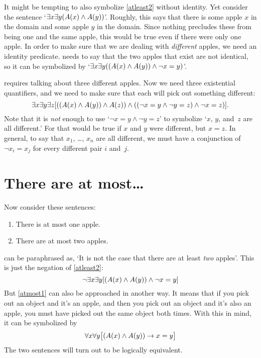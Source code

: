 It might be tempting to also symbolize \cref*{atleast2} without identity. Yet consider the sentence `$\exists x \exists y(A(x) \wedge A(y))$'. Roughly, this says that there is some apple $x$ in the domain and some apple $y$ in the domain. Since nothing precludes these from being one and the same apple, this would be true even if there were only one apple. In order to make sure that we are dealing with \emph{different} apples, we need an identity predicate.  needs to say that the two apples that exist are not identical, so it can be symbolized by `$\exists x \exists y((A(x) \wedge A(y)) \wedge \neg x = y)$'.

 requires talking about three different apples. Now we need three existential quantifiers, and we need to make sure that each will pick out something different: 
\[
	\exists x \exists y\exists z[((A(x) \wedge A(y)) \wedge A(z)) \wedge ((\neg x = y \wedge \neg y = z) \wedge \neg x = z)].
\]
Note that it is \emph{not} enough to use `$\lnot x = y \land \lnot y = z$' to symbolize `$x$, $y$, and~$z$ are all different.' For that would be true if $x$ and $y$ were different, but $x = z$. In general, to say that $x_1$, \dots, $x_n$ are all different, we must have a conjunction of $\lnot x_i = x_j$ for every different pair $i$ and~$j$.

\section{There are at most\ldots}
Now consider these sentences:
\begin{enumerate}
	\item\label{atmost1} There is at most one apple.
	\item\label{atmost2} There are at most two apples.
\end{enumerate}
 can be paraphrased as, `It is not the case that there are at least \emph{two} apples'. This is just the negation of \cref{atleast2}: 
$$\neg \exists x \exists y[(A(x) \wedge A(y)) \wedge \neg x = y]$$
But \cref*{atmost1} can also be approached in another way. It means that if you pick out an object and it's an apple, and then you pick out an object and it's also an apple, you must have picked out the same object both times. With this in mind, it can be symbolized by
$$\forall x\forall y\bigl[(A(x) \wedge A(y)) \rightarrow x=y\bigr]$$
The two sentences will turn out to be logically equivalent.

